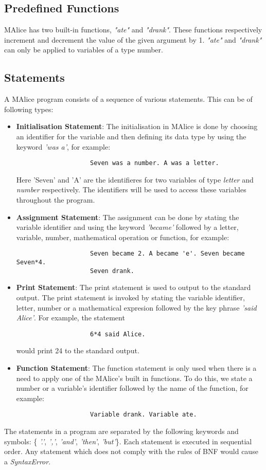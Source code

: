 \documentclass[a4wide, 11pt]{article}
\begin{document}
	\subsection{Predefined Functions}
	\label{sec:preFunc}
		MAlice has two built-in functions, \emph{"ate"} and \emph{"drank"}. These
		functions respectively increment and decrement the value of the given argument by 1.
		\emph{"ate"} and \emph{"drank"} can only be applied to variables of a type number.

	\subsection{Statements}
	\label{sec:statements}
		A MAlice program consists of a sequence of various statements. This can be of following types:
		\begin{itemize}
			\item {\bf Initialisation Statement}: The initialisation in MAlice is done by choosing an identifier
		 		for the variable and then defining its data type by using the keyword \emph{'was a'}, for example:
				\begin{verbatim}
					Seven was a number. A was a letter.
				\end{verbatim}
				Here 'Seven' and 'A' are the identifieres for two variables of type 
				\emph{letter} and \emph{number} respectively. The identifiers will be 
				used to access these variables throughout the program. 
			\item {\bf Assignment Statement}: The assignment can be done by stating the 
				variable identifier and using the keyword \emph{'became'} followed by a letter, variable, number, 
				mathematical operation or function, for example:  
				\begin{verbatim}
					Seven became 2. A became 'e'. Seven became Seven*4.
					Seven drank.
				\end{verbatim}
			\item {\bf Print Statement}: The print statement is used to output to the standard output. 
				The print statement is invoked by stating the variable identifier, letter, number
				or a mathematical expresion followed by the key phrase \emph{'said Alice'}. For example, the statement
				\begin{verbatim}
					6*4 said Alice.
				\end{verbatim}
				would print 24 to the standard output.
			\item {\bf Function Statement}: The function statement is only used when there is a need to apply 
				one of the MAlice's built in functions. To do this, we state a number or a variable's identifier 
				followed by the name of the function, for example:
				\begin{verbatim}
					Variable drank. Variable ate.	
				\end{verbatim}
		\end{itemize}
		The statements in a program are separated by the following keywords and symbols: 
		\{ \emph{'.'}, \emph{','}, \emph{'and'}, \emph{'then'}, \emph{'but'}\}.
		Each statement is executed in sequential order. Any statement which does not comply with
		the rules of BNF would cause a \emph{SyntaxError}.
\end{document}
